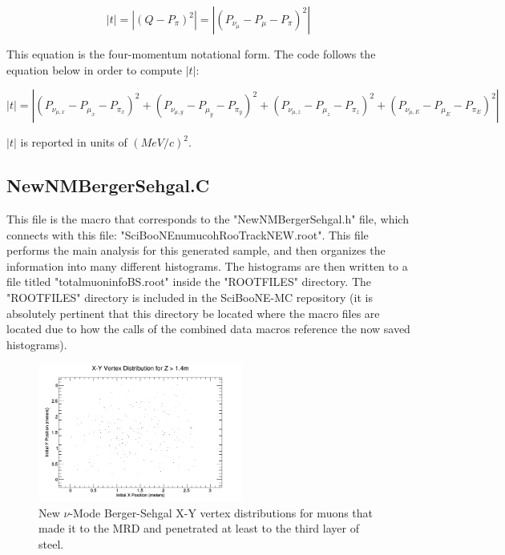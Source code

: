 \documentclass[11pt]{article}
\begin{document}
\begin{equation}
|t| = |(Q - P_\pi)^2| = |(P_{\nu_\mu} - P_\mu - P_\pi)^2|
\end{equation}

\noindent
This equation is the four-momentum notational form. The code follows the equation below in order to compute $|t|$:

\begin{equation}
|t| = |(P_{\nu_{\mu,x}} - P_{\mu_x} - P_{\pi_x})^2 + (P_{\nu_{\mu,y}} - P_{\mu_y} - P_{\pi_y})^2 + (P_{\nu_{\mu,z}} - P_{\mu_z} - P_{\pi_z})^2 + (P_{\nu_{\mu,E}} - P_{\mu_E} - P_{\pi_E})^2|
\end{equation}

\noindent
$|t|$ is reported in units of $(MeV/c)^2$.

\subsection{NewNMBergerSehgal.C}
This file is the macro that corresponds to the "NewNMBergerSehgal.h" file, which connects with this file: "SciBooNE\textunderscore numu\textunderscore coh\textunderscore RooTrack\textunderscore NEW.root". This file performs the main analysis for this generated sample, and then organizes the information into many different histograms. The histograms are then written to a file titled "totalmuoninfoBS.root" inside the "ROOTFILES" directory. The "ROOTFILES" directory is included in the SciBooNE-MC repository (it is absolutely pertinent that this directory be located where the macro files are located due to how the calls of the combined data macros reference the now saved histograms).

\begin{figure}[H]
\centering
\includegraphics[width=0.6\textwidth]{NewNMBergerSehgalImages/1-X-YVertexDistributionNMBS.png}
\caption{New $\nu$-Mode Berger-Sehgal X-Y vertex distributions for muons that made it to the MRD and penetrated at least to the third layer of steel.}
\end{figure}
\end{document}

